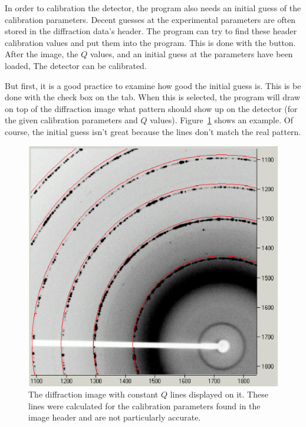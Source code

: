 In order to calibration the detector, the program also
needs an initial guess of the calibration parameters. 
Decent guesses at the experimental parameters are often
stored in the diffraction data's header. 
The program can try to find these header calibration values 
and put them into the program. This is done with the
 button. After the image, the $Q$ values, 
and an initial guess at the parameters have been loaded, 
The detector can be calibrated.

But first, it is a good practice to examine how good the 
initial guess is. This is be done with the 
check box on the  tab. When this is selected, 
the program will draw
on top of the diffraction image what pattern should show 
up on the detector (for the given calibration parameters and $Q$
values). Figure~\ref{bad_calibration_diffraction_image}
shows an example. Of course, the initial guess isn't
great because the lines don't match the real pattern.

\begin{figure}
    \centering
    \includegraphics[scale=.75]
    {figures/bad_calibration_diffraction_image.eps}
    \caption{The diffraction image with constant $Q$
    lines displayed on it. These lines were calculated
    for the calibration parameters found in the
    image header and are not particularly accurate.}
    \label{bad_calibration_diffraction_image}
\end{figure}

